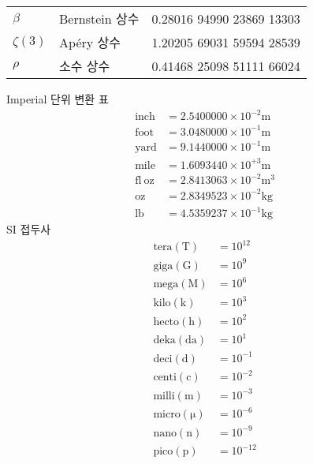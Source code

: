 \documentclass[10pt, a4paper]{article}
\begin{document}
\begin{center}
\begin{longtable}{l | l l}
        \hline
        \(\beta\)                       & Bernstein 상수                        & 0.28016 94990 23869 13303\\
        \(\zeta\left(3\right)\)         & Ap\'ery 상수                          & 1.20205 69031 59594 28539\\
        \(\rho\)                        & 소수 상수                             & 0.41468 25098 51111 66024\\
    \end{longtable}
    \vfill
    \huge{Imperial 단위 변환 표}\normalsize
    \begin{align*}
        \mathrm{inch}         &= 2.5400000 \times 10^{-2} \mathrm{m}\\
        \mathrm{foot}         &= 3.0480000 \times 10^{-1} \mathrm{m}\\
        \mathrm{yard}         &= 9.1440000 \times 10^{-1} \mathrm{m}\\
        \mathrm{mile}         &= 1.6093440 \times 10^{+3} \mathrm{m}\\
        \mathrm{fl\ oz}       &= 2.8413063 \times 10^{-2} \mathrm{m^3}\\
        \mathrm{oz}           &= 2.8349523 \times 10^{-2} \mathrm{kg}\\
        \mathrm{lb}           &= 4.5359237 \times 10^{-1} \mathrm{kg}
    \end{align*}
    \vfill
    \huge{SI 접두사}\normalsize
    \begin{align*}
        \mathrm{tera\left(T\right)} &= 10^{12}\\
        \mathrm{giga\left(G\right)} &= 10^{9}\\
        \mathrm{mega\left(M\right)} &= 10^{6}\\
        \mathrm{kilo\left(k\right)} &= 10^{3}\\
        \mathrm{hecto\left(h\right)} &= 10^{2}\\
        \mathrm{deka\left(da\right)} &= 10^{1}\\
        \mathrm{deci\left(d\right)} &= 10^{-1}\\
        \mathrm{centi\left(c\right)} &= 10^{-2}\\
        \mathrm{milli\left(m\right)} &= 10^{-3}\\
        \mathrm{micro\left(\mu\right)} &= 10^{-6}\\
        \mathrm{nano\left(n\right)} &= 10^{-9}\\
        \mathrm{pico\left(p\right)} &= 10^{-12}
    \end{align*}
\end{center}
\end{document}
